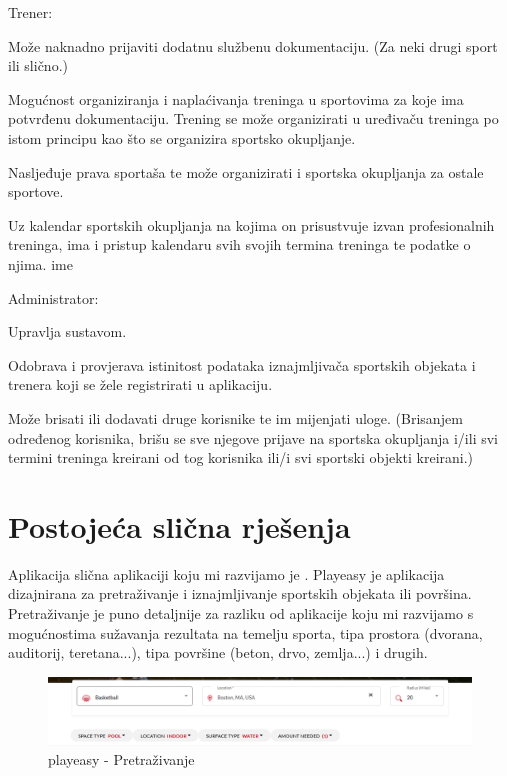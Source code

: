 \begin{packed_item}
		\item{Trener:
			\begin{packed_item}
				\item{Može naknadno prijaviti dodatnu službenu dokumentaciju. (Za neki drugi sport ili slično.)
				}
				\item{Mogućnost organiziranja i naplaćivanja treninga u sportovima za koje ima potvrđenu dokumentaciju.
					Trening se može organizirati u uređivaču treninga po istom principu kao što se organizira sportsko
					okupljanje.}
				\item{Nasljeđuje prava sportaša te može organizirati i sportska okupljanja za ostale sportove.
				}
				\item{Uz kalendar sportskih okupljanja na kojima on prisustvuje izvan profesionalnih
					treninga, ima i pristup kalendaru svih svojih termina treninga te podatke o njima.
					 ime}
			\end{packed_item}}
		
		\item{Administrator:
			\begin{packed_item}
				\item{Upravlja sustavom.}
				\item{Odobrava i provjerava istinitost podataka iznajmljivača sportskih objekata i trenera koji se 
					žele registrirati u aplikaciju.}
				\item{Može brisati ili dodavati druge korisnike te im mijenjati uloge. (Brisanjem određenog korisnika, 
					brišu se sve njegove prijave na sportska okupljanja i/ili svi termini treninga kreirani od tog korisnika
					ili/i svi sportski objekti kreirani.)
				}
			\end{packed_item}}
	\end{packed_item}
		
		
		\section{Postojeća slična rješenja}
		
		Aplikacija slična aplikaciji koju mi razvijamo je . Playeasy je aplikacija dizajnirana za pretraživanje i iznajmljivanje sportskih objekata ili površina. Pretraživanje je puno detaljnije za razliku od aplikacije koju mi razvijamo s mogućnostima sužavanja rezultata na temelju sporta, tipa prostora (dvorana, auditorij, teretana...), tipa površine (beton, drvo, zemlja...) i drugih.
		
		\begin{figure}[H]
			\includegraphics[scale=0.6]{slike/playeasy-pretrazivanje.PNG} %
			\centering
			\caption{playeasy - Pretraživanje}
			\label{fig:promjene}
		\end{figure}
		
